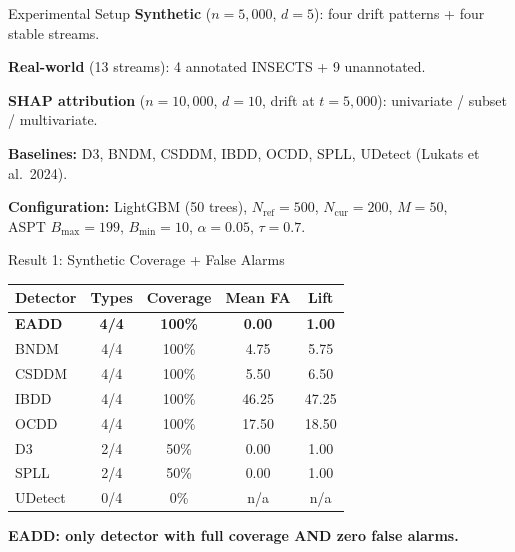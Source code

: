 \documentclass[aspectratio=169,10pt]{beamer}
\begin{document}
\begin{frame}{Experimental Setup}
\textbf{Synthetic} ($n{=}5{,}000$, $d{=}5$): four drift patterns + four stable streams.

\textbf{Real-world} (13 streams): 4 annotated INSECTS + 9 unannotated.

\textbf{SHAP attribution} ($n{=}10{,}000$, $d{=}10$, drift at $t{=}5{,}000$): univariate / subset / multivariate.

\textbf{Baselines:} D3, BNDM, CSDDM, IBDD, OCDD, SPLL, UDetect (Lukats et al.\ 2024).

\medskip
\textbf{Configuration:} LightGBM (50 trees), $N_{\mathrm{ref}}{=}500$, $N_{\mathrm{cur}}{=}200$, $M{=}50$, \\ ASPT $B_{\max}{=}199$, $B_{\min}{=}10$, $\alpha{=}0.05$, $\tau{=}0.7$.
\end{frame}

\begin{frame}{Result 1: Synthetic Coverage + False Alarms}
\centering\small
\begin{tabular}{lcccc}
\toprule
\textbf{Detector} & \textbf{Types} & \textbf{Coverage} & \textbf{Mean FA} & \textbf{Lift} \\
\midrule
\textbf{EADD}  & \textbf{4/4} & \textbf{100\%} & \textbf{0.00} & \textbf{1.00} \\
BNDM   & 4/4 & 100\% & 4.75  & 5.75 \\
CSDDM  & 4/4 & 100\% & 5.50  & 6.50 \\
IBDD   & 4/4 & 100\% & 46.25 & 47.25 \\
OCDD   & 4/4 & 100\% & 17.50 & 18.50 \\
D3     & 2/4 & 50\%  & 0.00  & 1.00 \\
SPLL   & 2/4 & 50\%  & 0.00  & 1.00 \\
UDetect& 0/4 & 0\%   & n/a   & n/a  \\
\bottomrule
\end{tabular}

\bigskip
\textbf{EADD: only detector with full coverage AND zero false alarms.}
\end{frame}
\end{document}
